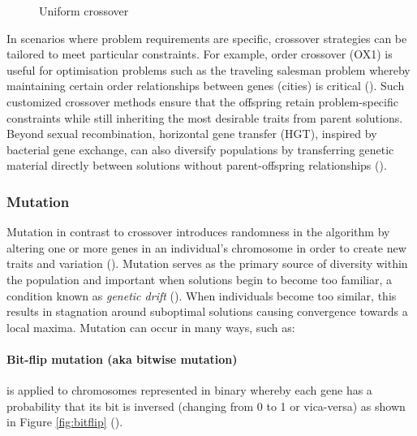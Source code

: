 \parbreak
\begin{figure}[th] %
	\centering %
	\caption{Uniform crossover}
	\label{fig:uniform} %
\end{figure}

\parbreak\noindent In scenarios where problem requirements are specific, crossover strategies can be tailored to meet particular constraints. For example, order crossover (OX1) is useful for optimisation problems such as the traveling salesman problem whereby maintaining certain order relationships between genes (cities) is critical (\cite{tsp}). Such customized crossover methods ensure that the offspring retain problem-specific constraints while still inheriting the most desirable traits from parent solutions. Beyond sexual recombination, horizontal gene transfer (HGT), inspired by bacterial gene exchange, can also diversify populations by transferring genetic material directly between solutions without parent-offspring relationships (\cite{hgt}).

\subsubsection{Mutation}\label{sec:ea_mutation}
Mutation in contrast to crossover introduces randomness in the algorithm by altering one or more genes in an individual's chromosome in order to create new traits and variation (\cite{evolutionaryComputingAndNeuralNetworks}). Mutation serves as the primary source of diversity within the population and important when solutions begin to become too familiar, a condition known as \textit{genetic drift} (\cite{advancesInEvolutionaryAlgorithms}). When individuals become too similar, this results in stagnation around suboptimal solutions causing convergence towards a local maxima. Mutation can occur in many ways, such as:

\parbreak\noindent \paragraph{Bit-flip mutation (aka bitwise mutation)} is applied to chromosomes represented in binary whereby each gene has a probability that its bit is inversed (changing from 0 to 1 or vica-versa) as shown in Figure \ref{fig:bitflip} (\cite{intelligentOptimization}).
	
